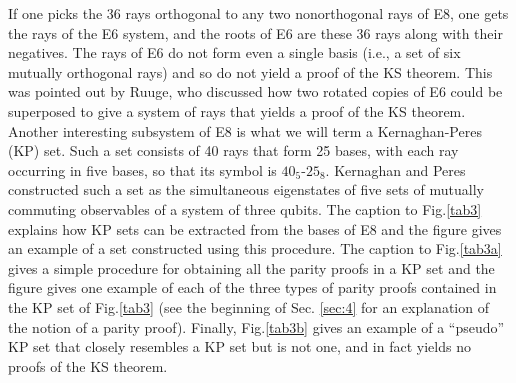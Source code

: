 If one picks the 36 rays orthogonal to any two nonorthogonal rays of E8, one gets the rays of the E6 system, and the roots of E6 are these 36 rays along with  their negatives. The rays of E6 do not form even a single basis (i.e., a set of six mutually orthogonal rays) and so do not yield a proof of the KS theorem. This was pointed out by Ruuge\cite{ruugeE6}, who discussed how two rotated copies of E6 could be superposed to give a system of rays that yields a proof of the KS theorem.\\

Another interesting subsystem of E8 is what we will term a Kernaghan-Peres (KP) set\cite{KP1995}. Such a set consists of 40 rays that form 25 bases, with each ray occurring in five bases, so that its symbol is $40_{5}$-$25_{8}$. Kernaghan and Peres\cite{KP1995} constructed such a set as the simultaneous eigenstates of five sets of mutually commuting observables of a system of three qubits. The caption to Fig.\ref{tab3} explains how KP sets can be extracted from the bases of E8 and the figure gives an example of a set constructed using this procedure. The caption to Fig.\ref{tab3a} gives a simple procedure for obtaining all the parity proofs in a KP set\cite{Waegell2012a} and the figure gives one example of each of the three types of parity proofs contained in the KP set of Fig.\ref{tab3} (see the beginning of Sec. \ref{sec:4} for an explanation of the notion of a parity proof). Finally, Fig.\ref{tab3b} gives an example of a ``pseudo'' KP set that closely resembles a KP set but is not one, and in fact yields no proofs of the KS theorem.

